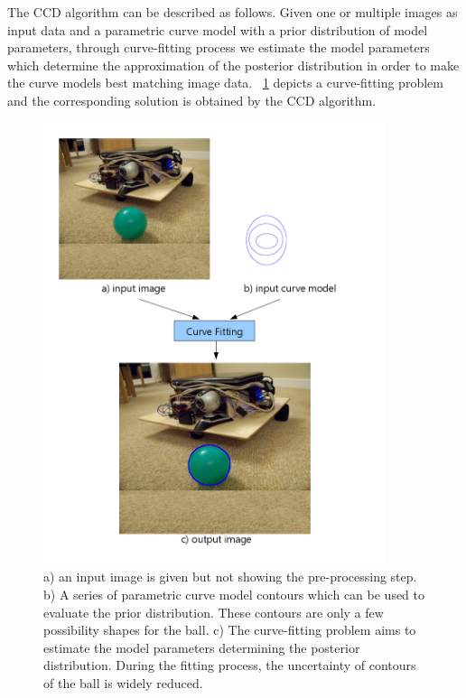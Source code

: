 The CCD algorithm can be described as follows. Given one or multiple images as input
data and a parametric curve model with a prior distribution of model
parameters, through curve-fitting process we estimate the model
parameters which determine the approximation of the posterior
distribution in order to make the curve models best matching image data.
~\ref{fig:fitting} depicts a curve-fitting problem and the
corresponding solution is obtained by the
CCD algorithm.
\begin{figure}[htb]
  \centering
  \includegraphics[width=10cm]{images/fitting.png}
  \caption[The description of curve-fitting problem]{a) an input
    image is given but not showing the pre-processing step. b) A series of
    parametric curve model contours which can be used to evaluate the
    prior distribution. These contours are only a few possibility
    shapes for the ball. c) The curve-fitting problem aims to estimate the model
    parameters determining the posterior distribution. During the
    fitting process, the uncertainty of contours of the ball is widely
    reduced.}
  \label{fig:fitting}
\end{figure}



